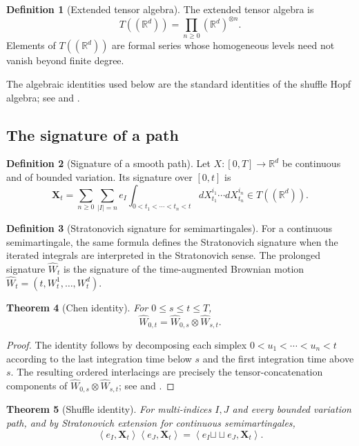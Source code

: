 \documentclass[11pt,oneside]{article}
\theoremstyle{plain}
\newtheorem{theorem}{Theorem}[section]
\theoremstyle{definition}
\newtheorem{definition}[theorem]{Definition}
\theoremstyle{remark}
\newcommand{\R}{\mathbb{R}}
\newcommand{\cW}{\widehat W}
\newcommand{\sh}{\mathbin{\sqcup\!\sqcup}}
\newcommand{\inner}[2]{\left\langle #1,#2\right\rangle}
\begin{document}
\begin{definition}[Extended tensor algebra]
The extended tensor algebra is
\[
T((\R^d))=\prod_{n\geq0}(\R^d)^{\otimes n}.
\]
Elements of $T((\R^d))$ are formal series whose homogeneous levels need not vanish beyond finite degree.
\end{definition}

The algebraic identities used below are the standard identities of the shuffle Hopf algebra; see \citet[Chapters 1 and 6]{Reutenauer1993} and \citet[Chapter 2]{FrizVictoir2010}.

\subsection{The signature of a path}

\begin{definition}[Signature of a smooth path]
Let $X:[0,T]\to\R^d$ be continuous and of bounded variation. Its signature over $[0,t]$ is
\[
\mathbf X_t=\sum_{n\geq0}\sum_{|I|=n} e_I
\int_{0<t_1<\cdots<t_n<t} dX^{i_1}_{t_1}\cdots dX^{i_n}_{t_n}\in T((\R^d)).
\]
\end{definition}

\begin{definition}[Stratonovich signature for semimartingales]
For a continuous semimartingale, the same formula defines the Stratonovich signature when the iterated integrals are interpreted in the Stratonovich sense. The prolonged signature $\cW_t$ is the signature of the time-augmented Brownian motion $\widehat W_t=(t,W^1_t,\ldots,W^d_t)$.
\end{definition}

\begin{theorem}[Chen identity]
For $0\leq s\leq t\leq T$,
\[
\cW_{0,t}=\cW_{0,s}\otimes \cW_{s,t}.
\]
\end{theorem}

\begin{proof}
The identity follows by decomposing each simplex $0<u_1<\cdots<u_n<t$ according to the last integration time below $s$ and the first integration time above $s$. The resulting ordered interlacings are precisely the tensor-concatenation components of $\cW_{0,s}\otimes \cW_{s,t}$; see \citet{Chen1977} and \citet[Chapter 2]{FrizVictoir2010}.
\end{proof}

\begin{theorem}[Shuffle identity]
For multi-indices $I,J$ and every bounded variation path, and by Stratonovich extension for continuous semimartingales,
\[
\inner{e_I}{\mathbf X_t}\inner{e_J}{\mathbf X_t}=\inner{e_I\sh e_J}{\mathbf X_t}.
\]
\end{theorem}
\end{document}
